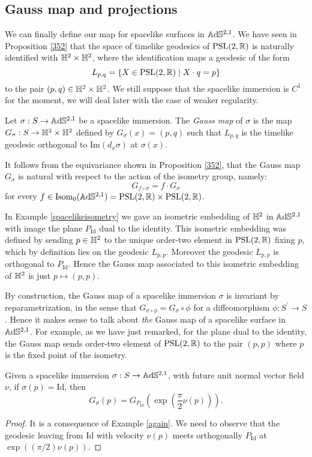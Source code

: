 \subsection{Gauss map and projections} We can finally define our map for spacelike surfaces in $\mathbb{A}\mathrm{d}\mathbb{S}^{2,1}$. We have seen in Proposition \ref{352} that the space of timelike geodesics of $\text{PSL}(2,\mathbb{R})$ is naturally identified with $\mathbb{H}^2\times\mathbb{H}^2$, where the identification maps a geodesic of the form
\[
    L_{p,q}=\{X\in\text{PSL}(2,\mathbb{R})\;|\;X\cdot q =p\}
\]
to the pair $(p,q)\in \mathbb{H}^2\times\mathbb{H}^2$. We still suppose that the spacelike immersion is $C^1$ for the moment, we will deal later with the case of weaker regularity. 
\begin{definition}
    Let $\sigma:S\to\mathbb{A}\mathrm{d}\mathbb{S}^{2,1}$ be a spacelike immersion. The \textit{Gauss map} of $\sigma$ is the map $G_\sigma:S\to\mathbb{H}^2\times\mathbb{H}^2$ defined by $G_\sigma(x)=(p,q)$ such that $L_{p,q}$ is the timelike geodesic orthogonal to $\text{Im}(d_x\sigma)$ at $\sigma(x).$
    \end{definition}
   It follows from the equivariance shown in Proposition \ref{352}, that the Gauss map $G_\sigma$ is natural with respect to the action of the isometry group, namely: 
    \[
        G_{f\circ\sigma}=f\cdot G_\sigma
    \]
    for every $f\in\text{Isom}_0(\mathbb{A}\mathrm{d}\mathbb{S}^{2,1})=\text{PSL}(2,\mathbb{R})\times\text{PSL}(2,\mathbb{R})$.
    \begin{example}\label{again}
        In Example \ref{spacelikeisometry} we gave an isometric embedding of $\mathbb{H}^2$ in $\mathbb{A}\mathrm{d}\mathbb{S}^{2,1}$ with image the plane $P_{\text{Id}}$ dual to the identity. This isometric embedding was defined by sending $p\in\mathbb{H}^2$ to the unique order-two element in $\text{PSL}(2,\mathbb{R})$ fixing $p$, which by definition lies on the geodesic $L_{p,p}$. Moreover the geodesic $L_{p,p}$ is orthogonal to $P_{\text{Id}}$. Hence the Gauss map associated to this isometric embedding of $\mathbb{H}^2$ is just $p\mapsto (p,p).$
       \end{example}

    By construction, the Gauss map of a spacelike immersion $\sigma$ is invariant by reparametrization, in the sense that $G_{\sigma\circ\phi}=G_\sigma\circ\phi$ for a diffeomorphism $\phi:S^{\prime} \to S$. Hence it makes sense to talk about \textit{the} Gauss map of a spacelike surface in $\mathbb{A}\mathrm{d}\mathbb{S}^{2,1}$. For example, as we have just remarked, for the plane dual to the identity, the Gauss map sends order-two element of $\text{PSL}(2,\mathbb{R})$ to the pair $(p,p)$ where $p$ is the fixed point of the isometry.
    
    \begin{lemma}\label{633}
        Given a spacelike immersion $\sigma:S\to\mathbb{A}\mathrm{d}\mathbb{S}^{2,1}$, with future unit normal vector field $\nu$, if $\sigma(p)=\text{Id}$, then 
        \begin{equation}\label{gaussmap}
            G_\sigma(p)=G_{P_\text{Id}}(\exp(\frac{\pi}{2}\nu(p))).
        \end{equation}
    \end{lemma}
    \begin{proof}
        It is a consequence of Example \ref{again}. We need to observe that the geodesic leaving from Id with velocity $\nu(p)$ meets orthogonally $P_\text{Id}$ at $\exp((\pi/2)\nu(p)).$
    \end{proof}

